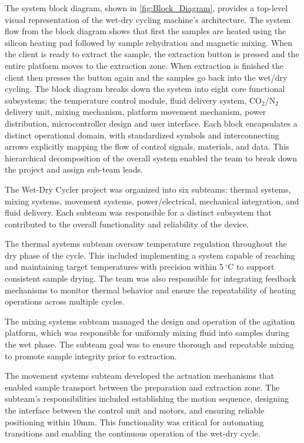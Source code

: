 \documentclass[12pt]{article}
\begin{document}
    The system block diagram, shown in \autoref{fig:Block_Diagram}, provides a top-level visual representation of the wet-dry cycling machine’s architecture. The system flow from the block diagram shows that first the samples are heated using the silicon heating pad followed by sample rehydration and magnetic mixing. When the client is ready to extract the sample, the extraction button is pressed and the entire platform moves to the extraction zone. When extraction is finished the client then presses the button again and the samples go back into the wet/dry cycling. The block diagram breaks down the system into eight core functional subsystems; the temperature control module, fluid delivery system, CO$_2$/N$_2$ delivery unit, mixing mechanism, platform movement mechanism, power distribution, microcontroller design and user interface. Each block encapsulates a distinct operational domain, with standardized symbols and interconnecting arrows explicitly mapping the flow of control signals, materials, and data. This hierarchical decomposition of the overall system enabled the team to break down the project and assign sub-team leads. 

    The Wet-Dry Cycler project was organized into six subteams: thermal systems, mixing systems, movement systems, power/electrical, mechanical integration, and fluid delivery. Each subteam was responsible for a distinct subsystem that contributed to the overall functionality and reliability of the device.

   The thermal systems subteam oversaw temperature regulation throughout the dry phase of the cycle. This included implementing a system capable of reaching and maintaining target temperatures with precision within 5$\,^\circ\mathrm{C}$ to support consistent sample drying. The team was also responsible for integrating feedback mechanisms to monitor thermal behavior and ensure the repeatability of heating operations across multiple cycles.

    The mixing systems subteam managed the design and operation of the agitation platform, which was responsible for uniformly mixing fluid into samples during the wet phase. The subteam goal was to ensure thorough and repeatable mixing to promote sample integrity prior to extraction. 
    
    The movement systems subteam developed the actuation mechanisms that enabled sample transport between the preparation and extraction zone. The subteam's responsibilities included establishing the motion sequence, designing the interface between the control unit and motors, and ensuring reliable positioning within 10mm. This functionality was critical for automating transitions and enabling the continuous operation of the wet-dry cycle.
    
\end{document}
